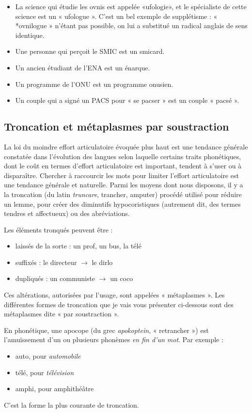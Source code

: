 \begin{itemize}
\item La science qui étudie les ovnis est appelée «ufologie», et le spécialiste de cette science est un « ufologue ». C’est un bel exemple de supplétisme : « *ovnilogue » n’étant pas possible, on lui a substitué un radical anglais de sens identique.
\item Une personne qui perçoit le SMIC est un smicard.
\item Un ancien étudiant de l’ENA est un énarque.
\item Un programme de l’ONU est un programme onusien.
\item Un couple qui a signé un PACS pour « se pacser » est un couple « pacsé ».
\end{itemize}

\subsection{Troncation et métaplasmes par soustraction}
La loi du moindre effort articulatoire évoquée plus haut est une tendance générale constatée dans l’évolution des langues selon laquelle certains traits phonétiques, dont le coût en termes d’effort articulatoire est important, tendent à s’user ou à disparaître. Chercher à raccourcir les mots pour limiter l’effort articulatoire est une tendance générale et naturelle. Parmi les moyens dont nous disposons, il y a la troncation (du latin \textit{truncare}, trancher, amputer) procédé utilisé pour réduire un lemme, pour créer des diminutifs hypocoristiques (autrement dit, des termes tendres et affectueux) ou des abréviations.

Les éléments tronqués peuvent être :
\begin{itemize}
\item laissés de la sorte : un prof, un bus, la télé
\item suffixés : le directeur $\rightarrow$ le dirlo
\item dupliqués : un communiste $\rightarrow$ un coco
\end{itemize}
Ces altérations, autorisées par l’usage, sont appelées « métaplasmes ». Les différentes formes de troncation que je vais vous présenter ci-dessous sont des métaplasmes dite « par soustraction ».

En phonétique, une apocope (du grec \textit{apokoptein}, « retrancher ») est l’amuïssement d’un ou plusieurs phonèmes \textit{en fin d’un mot}. Par exemple :
\begin{itemize}
\item auto, pour \textit{automobile}
\item télé, pour \textit{télévision}
\item amphi, pour amphithéâtre
\end{itemize}
C’est la forme la plus courante de troncation.


